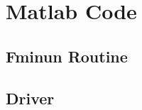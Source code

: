 \documentclass{article}
\begin{document}
\singlespacing
\title{}
\author{Landon Wright}
\maketitle
%

\section{Matlab Code}

\subsection{Fminun Routine}
\subsection{Driver}


\end{document}
